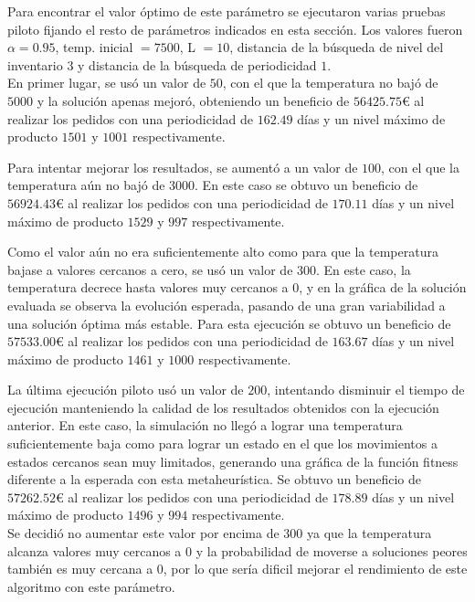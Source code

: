 \documentclass[a4paper,12pt]{article}
\begin{document}
	Para encontrar el valor óptimo de este parámetro se ejecutaron varias pruebas piloto fijando el resto de parámetros indicados en esta sección. Los valores fueron $\alpha = 0.95$, temp. inicial $=7500$, L $=10$, distancia de la búsqueda de nivel del inventario $3$ y distancia de la búsqueda de periodicidad $1$. \\ 
	
	En primer lugar, se usó un valor de $50$, con el que la temperatura no bajó de $5000$ y la solución apenas mejoró, obteniendo un beneficio de $56425.75$\euro \hspace{1mm} al realizar los pedidos con una periodicidad de $162.49$ días y un nivel máximo de producto $1501$ y $1001$ respectivamente.
	
	Para intentar mejorar los resultados, se aumentó a un valor de $100$, con el que la temperatura aún no bajó de $3000$. En este caso se obtuvo un beneficio de $56924.43$\euro \hspace{1mm} al realizar los pedidos con una periodicidad de $170.11$ días y un nivel máximo de producto $1529$ y $997$ respectivamente.
	
	Como el valor aún no era suficientemente alto como para que la temperatura bajase a valores cercanos a cero, se usó un valor de $300$. En este caso, la temperatura decrece hasta valores muy cercanos a $0$, y en la gráfica de la solución evaluada se observa la evolución esperada, pasando de una gran variabilidad a una solución óptima más estable. Para esta ejecución se obtuvo un beneficio de $57533.00$\euro \hspace{1mm} al realizar los pedidos con una periodicidad de $163.67$ días y un nivel máximo de producto $1461$ y $1000$ respectivamente.
	
	La última ejecución piloto usó un valor de $200$, intentando disminuir el tiempo de ejecución manteniendo la calidad de los resultados obtenidos con la ejecución anterior. En este caso, la simulación no llegó a lograr una temperatura suficientemente baja como para lograr un estado en el que los movimientos a estados cercanos sean muy limitados, generando una gráfica de la función fitness diferente a la esperada con esta metaheurística. Se obtuvo un beneficio de $57262.52$\euro \hspace{1mm} al realizar los pedidos con una periodicidad de $178.89$ días y un nivel máximo de producto $1496$ y $994$ respectivamente.\\
	
	Se decidió no aumentar este valor por encima de $300$ ya que la temperatura alcanza valores muy cercanos a $0$ y la probabilidad de moverse a soluciones peores también es muy cercana a $0$, por lo que sería dificil mejorar el rendimiento de este algoritmo con este parámetro.\\
	
\end{document}
